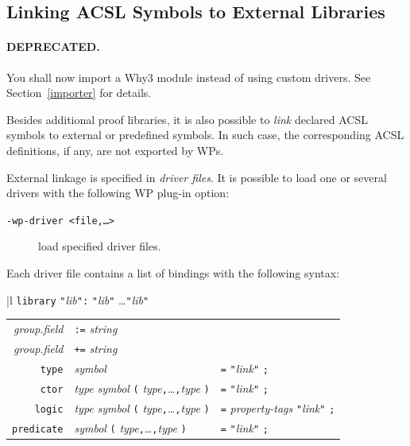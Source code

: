 \subsection{Linking \textsf{ACSL} Symbols to External Libraries}
\label{drivers}

\paragraph{DEPRECATED.} You shall now import a Why3 module
instead of using custom drivers. See Section~\ref{importer} for details.

Besides additional proof libraries, it is also possible to
\emph{link} declared \textsf{ACSL} symbols to external or predefined
symbols. In such case, the corresponding \textsf{ACSL} definitions,
if any, are not exported by \textsf{WP}s.

External linkage is specified in \emph{driver files}. It is possible
to load one or several drivers with the following \textsf{WP} plug-in option:
\begin{description}
\item[\tt -wp-driver <file,\ldots>] load specified driver files.
\end{description}

\newcommand{\ccc}{\texttt{,}\ldots\texttt{,}}
\newcommand{\user}[1]{\texttt{"}\textit{#1}\texttt{"}}
Each driver file contains a list of bindings with the following syntax:
\begin{center}
  \begin{tabular}{|l}
  \texttt{library} \user{lib}\verb':' \user{lib} \ldots \user{lib} \\
  \quad\begin{tabular}{rll}
  \rule{0em}{1.2em}
  \textit{group}.\textit{field} &\texttt{:=} \textit{string} \\
  \textit{group}.\textit{field} &\texttt{+=} \textit{string} \\
  \texttt{type} & \textit{symbol} & \verb'=' \user{link} \verb';' \\
  \texttt{ctor} & \textit{type} \textit{symbol}
                   \verb'(' \textit{type}\ccc\textit{type} \verb')'
                 & \verb'=' \user{link} \verb';' \\
  \texttt{logic} & \textit{type} \textit{symbol}
                   \verb'(' \textit{type}\ccc\textit{type} \verb')'
                 & \verb'=' \textit{property-tags} \user{link} \verb';' \\
  \texttt{predicate} & \textit{symbol}
                   \verb'(' \textit{type}\ccc\textit{type} \verb')'
                 & \verb'=' \user{link} \verb';'
  \end{tabular}
  \end{tabular}
\end{center}

